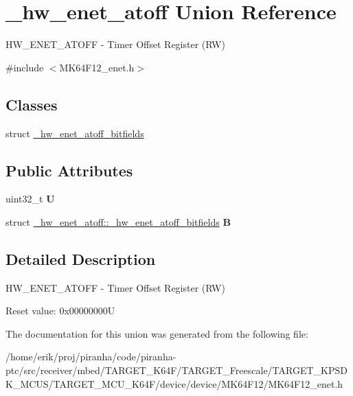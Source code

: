 \hypertarget{union__hw__enet__atoff}{}\section{\+\_\+hw\+\_\+enet\+\_\+atoff Union Reference}
\label{union__hw__enet__atoff}


H\+W\+\_\+\+E\+N\+E\+T\+\_\+\+A\+T\+O\+FF -\/ Timer Offset Register (RW)  




{\ttfamily \#include $<$M\+K64\+F12\+\_\+enet.\+h$>$}

\subsection*{Classes}
\begin{DoxyCompactItemize}
\item 
struct \hyperlink{struct__hw__enet__atoff_1_1__hw__enet__atoff__bitfields}{\+\_\+hw\+\_\+enet\+\_\+atoff\+\_\+bitfields}
\end{DoxyCompactItemize}
\subsection*{Public Attributes}
\begin{DoxyCompactItemize}
\item 
uint32\+\_\+t {\bfseries U}\hypertarget{union__hw__enet__atoff_a69acb3f9546a4efae35f516d04a44f10}{}\label{union__hw__enet__atoff_a69acb3f9546a4efae35f516d04a44f10}

\item 
struct \hyperlink{struct__hw__enet__atoff_1_1__hw__enet__atoff__bitfields}{\+\_\+hw\+\_\+enet\+\_\+atoff\+::\+\_\+hw\+\_\+enet\+\_\+atoff\+\_\+bitfields} {\bfseries B}\hypertarget{union__hw__enet__atoff_ae7d557ef0ec35de96140b731d24e9f60}{}\label{union__hw__enet__atoff_ae7d557ef0ec35de96140b731d24e9f60}

\end{DoxyCompactItemize}


\subsection{Detailed Description}
H\+W\+\_\+\+E\+N\+E\+T\+\_\+\+A\+T\+O\+FF -\/ Timer Offset Register (RW) 

Reset value\+: 0x00000000U 

The documentation for this union was generated from the following file\+:\begin{DoxyCompactItemize}
\item 
/home/erik/proj/piranha/code/piranha-\/ptc/src/receiver/mbed/\+T\+A\+R\+G\+E\+T\+\_\+\+K64\+F/\+T\+A\+R\+G\+E\+T\+\_\+\+Freescale/\+T\+A\+R\+G\+E\+T\+\_\+\+K\+P\+S\+D\+K\+\_\+\+M\+C\+U\+S/\+T\+A\+R\+G\+E\+T\+\_\+\+M\+C\+U\+\_\+\+K64\+F/device/device/\+M\+K64\+F12/M\+K64\+F12\+\_\+enet.\+h\end{DoxyCompactItemize}
